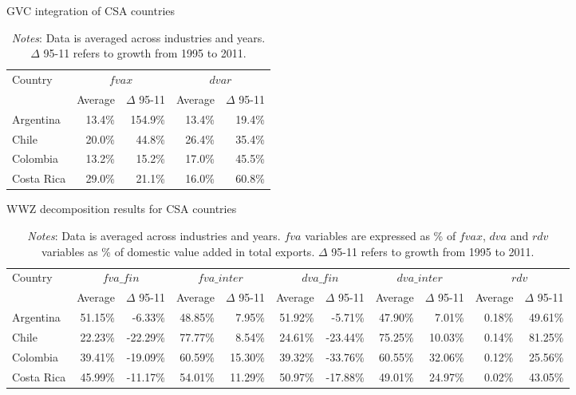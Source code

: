 \documentclass[a4paper,11pt]{article}
\begin{document}
\begin{table}[htbp]\small
  \centering
  \caption{GVC integration of CSA countries}
    \begin{tabular}{lrrrr}
    \toprule
    Country & \multicolumn{2}{c}{{$fvax$}} & \multicolumn{2}{c}{{$dvar$}} \\
    \multicolumn{1}{c}{} & \multicolumn{1}{c}{Average} & \multicolumn{1}{c}{$\Delta$ 95-11} & \multicolumn{1}{c}{Average} & \multicolumn{1}{c}{$\Delta$ 95-11} \\
    \midrule
    Argentina & 13.4\% & 154.9\% & 13.4\% & 19.4\% \\
    Chile & 20.0\% & 44.8\% & 26.4\% & 35.4\% \\
    Colombia & 13.2\% & 15.2\% & 17.0\% & 45.5\% \\
    Costa Rica & 29.0\% & 21.1\% & 16.0\% & 60.8\% \\
    \bottomrule
\end{tabular}
  \label{tab:csagvc}
     \caption*{\textit{Notes}: Data is averaged across industries and years. $\Delta$ 95-11 refers to growth from 1995 to 2011.}

\end{table}

\begin{table}[htbp]\small
  \centering
  \caption{WWZ decomposition results for CSA countries}
  \hspace*{-2.9cm}
    \begin{tabular}{lrrrrrrrrrr} 
    \toprule
    \multicolumn{1}{l}{{Country}} & \multicolumn{2}{c}{$fva\_fin$} & \multicolumn{2}{c}{$fva\_inter$} & \multicolumn{2}{c}{$dva\_fin$} & \multicolumn{2}{c}{$dva\_inter$} & \multicolumn{2}{c}{$rdv$} \\
    \multicolumn{1}{l}{} & \multicolumn{1}{c}{Average} & \multicolumn{1}{c}{$\Delta$ 95-11} &
\multicolumn{1}{c}{Average} & \multicolumn{1}{c}{$\Delta$ 95-11} & \multicolumn{1}{c}{Average} & \multicolumn{1}{c}{$\Delta$ 95-11} & \multicolumn{1}{c}{Average} & \multicolumn{1}{c}{$\Delta$ 95-11} & \multicolumn{1}{c}{Average} & \multicolumn{1}{c}{$\Delta$ 95-11} \\
  \midrule
    Argentina & 51.15\% & -6.33\% & 48.85\% & 7.95\% & 51.92\% & -5.71\% & 47.90\% & 7.01\% & 0.18\% & 49.61\% \\
    Chile & 22.23\% & -22.29\% & 77.77\% & 8.54\% & 24.61\% & -23.44\% & 75.25\% & 10.03\% & 0.14\% & 81.25\% \\
    Colombia & 39.41\% & -19.09\% & 60.59\% & 15.30\% & 39.32\% & -33.76\% & 60.55\% & 32.06\% & 0.12\% & 25.56\% \\
    Costa Rica & 45.99\% & -11.17\% & 54.01\% & 11.29\% & 50.97\% & -17.88\% & 49.01\% & 24.97\% & 0.02\% & 43.05\% \\
   \bottomrule
    \end{tabular}
  \label{tab:csawwz}
     \caption*{\textit{Notes}: Data is averaged across industries and years. $fva$ variables are expressed as \% of $fvax$, $dva$ and $rdv$ variables as \% of domestic value added in total exports. $\Delta$ 95-11 refers to growth from 1995 to 2011.}
\end{table}
\end{document}
